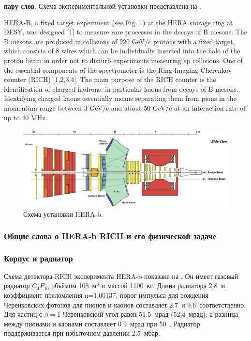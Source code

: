 \todo \textbf{пару слов}. Схема экспериментальной установки представлена на .

HERA-B, a fixed target experiment (see Fig. 1) at the HERA storage ring at DESY, was designed [1] to measure rare processes in the decays of B mesons. The B mesons are produced in collisions of 920 GeV/c protons with a fixed target, which consists of 8 wires which can be individually inserted into the halo of the proton beam in order not to disturb experiments measuring ep collisions. One of the essential components of the spectrometer is the Ring Imaging Cherenkov counter (RICH) [1,2,3,4]. The main purpose of the RICH counter is the identification of charged hadrons, in particular kaons from decays of B mesons. Identifying charged kaons essentially means separating them from pions in the momentum range between 3 GeV/c and about 50 GeV/c at an interaction rate of up to 40 MHz.

\begin{figure}[H]
\centering
\includegraphics[width=1.0\textwidth]{pictures/HERA_b_setup.png}
\caption{Схема установки HERA-b.}
\label{fig:HERAbSetup}
\end{figure}

\subsubsection{Общие слова о HERA-b RICH и его физической задаче}



\subsubsection{Корпус и радиатор}

Схема детектора RICH эксперимента HERA-b показана на . Он имеет газовый радиатор $C_{4}F_{10}$ объёмом 108~м$^3$ и массой 1100~кг. Длина радиатора 2.8~м, коэффициент преломления n=1.00137, порог импульса для рождения Черенковских фотонов для пионов и каонов составляет 2.7~\GeVoverC и 9.6~\GeVoverC соответственно. Для частиц с $\beta=1$ Черенковский угол равен 51.5~мрад (52.4~мрад), а разница между пионами и каонами составляет 0.9~мрад при 50~\GeVoverC. Радиатор поддерживается при избыточном давлении 2.5~мбар.

